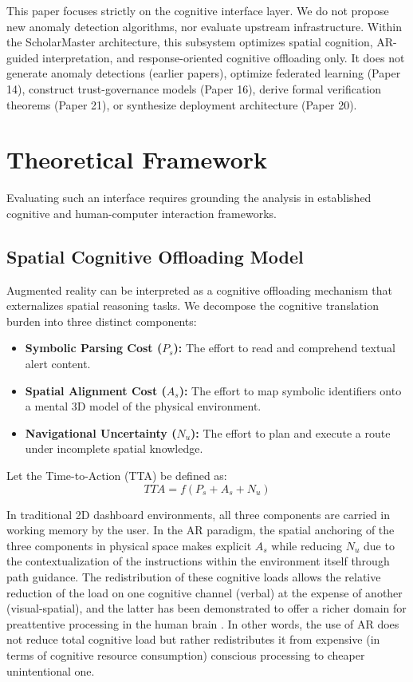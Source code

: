\documentclass[conference]{IEEEtran}
\begin{document}
This paper focuses strictly on the cognitive interface layer. We do not propose new anomaly detection algorithms, nor evaluate upstream infrastructure. Within the ScholarMaster architecture, this subsystem optimizes spatial cognition, AR-guided interpretation, and response-oriented cognitive offloading only. It does not generate anomaly detections (earlier papers), optimize federated learning (Paper 14), construct trust-governance models (Paper 16), derive formal verification theorems (Paper 21), or synthesize deployment architecture (Paper 20).

\section{Theoretical Framework}

Evaluating such an interface requires grounding the analysis in established cognitive and human-computer interaction frameworks.

\subsection{Spatial Cognitive Offloading Model}
Augmented reality can be interpreted as a cognitive offloading mechanism that externalizes spatial reasoning tasks. We decompose the cognitive translation burden into three distinct components:
\begin{itemize}
    \item \textbf{Symbolic Parsing Cost ($P_s$):} The effort to read and comprehend textual alert content.
    \item \textbf{Spatial Alignment Cost ($A_s$):} The effort to map symbolic identifiers onto a mental 3D model of the physical environment.
    \item \textbf{Navigational Uncertainty ($N_u$):} The effort to plan and execute a route under incomplete spatial knowledge.
\end{itemize}
Let the Time-to-Action (TTA) be defined as:
\begin{equation}
TTA = f(P_s + A_s + N_u)
\end{equation}

In traditional 2D dashboard environments, all three components are carried in working memory by the user. In the AR paradigm, the spatial anchoring of the three components in physical space makes explicit $A_s$ while reducing $N_u$ due to the contextualization of the instructions within the environment itself through path guidance. The redistribution of these cognitive loads allows the relative reduction of the load on one cognitive channel (verbal) at the expense of another (visual-spatial), and the latter has been demonstrated to offer a richer domain for preattentive processing in the human brain \cite{b25}. In other words, the use of AR does not reduce total cognitive load but rather redistributes it from expensive (in terms of cognitive resource consumption) conscious processing to cheaper unintentional one.
\end{document}

